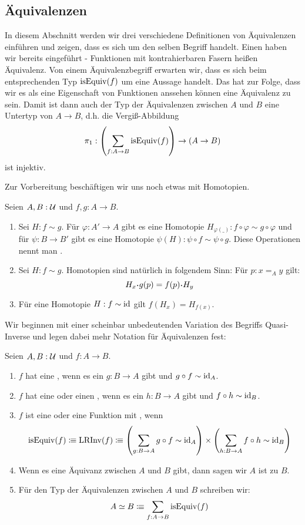 \subsection{Äquivalenzen}
\label{sub:aequivalenzen}

In diesem Abschnitt werden wir drei verschiedene Definitionen von Äquivalenzen einführen und zeigen,
dass es sich um den selben Begriff handelt. Einen haben wir bereits eingeführt - Funktionen mit kontrahierbaren Fasern heißen Äquivalenz.
Von einem Äquivalenzbegriff erwarten wir, dass es sich beim entsprechenden Typ $\mathrm{isEquiv}(f)$ um eine Aussage handelt.
Das hat zur Folge, dass wir es als eine Eigenschaft von Funktionen anssehen können eine Äquivalenz zu sein.
Damit ist dann auch der Typ der Äquivalenzen zwischen $A$ und $B$ eine Untertyp von $A\to B$, d.h. die Vergiß-Abbildung
\[
  \pi_1:\left(\sum_{f:A\to B}\mathrm{isEquiv}(f)\right)\to (A\to B)
\]
ist injektiv.

Zur Vorbereitung beschäftigen wir uns noch etwas mit Homotopien.
\begin{bemerkung}
  Seien $A,B:\mathcal{U}$ und $f,g:A\to B$.
  \begin{enumerate}
  \item Sei $H:f\sim g$. Für $\varphi:A'\to A$ gibt es eine Homotopie $H_{\varphi(\_)}:f\circ \varphi\sim g\circ \varphi$ und für $\psi:B\to B'$ gibt es eine Homotopie $\psi(H):\psi\circ f\sim \psi\circ g$. Diese Operationen nennt man .
  \item Sei $H:f\sim g$. Homotopien sind natürlich in folgendem Sinn: Für $p:x=_A y$ gilt:
    \[
      H_x\kon g(p) = f(p)\kon H_{y}
    \]
  \item Für eine Homotopie $H:f\sim\mathrm{id}$ gilt $f(H_x)=H_{f(x)}$.
  \end{enumerate}
\end{bemerkung}


Wir beginnen mit einer scheinbar unbedeutenden Variation des Begriffs Quasi-Inverse und legen dabei mehr Notation für Äquivalenzen fest:

\begin{definition}
  Seien $A,B:\mathcal{U}$ und $f:A\to B$.
  \begin{enumerate}
  \item $f$ hat eine , wenn es ein $g:B\to A$ gibt und $g\circ f\sim\mathrm{id}_A$.
  \item $f$ hat eine  oder einen , wenn es ein $h:B\to A$ gibt und $f\circ h\sim \mathrm{id}_B$.
  \item $f$ ist eine  oder eine Funktion mit , wenn
    \[
      \mathrm{isEquiv}(f)\vcentcolon\mspace{-1.2mu}\equiv\mathrm{LRInv}(f)\vcentcolon\mspace{-1.2mu}\equiv  \left(\sum_{g:B\to A}g\circ f\sim\mathrm{id}_A\right)\times\left(\sum_{h:B\to A}f\circ h\sim\mathrm{id}_B\right)
    \]
  \item Wenn es eine Äquivanz zwischen $A$ und $B$ gibt, dann sagen wir $A$ ist  zu $B$.
  \item Für den Typ der Äquivalenzen zwischen $A$ und $B$ schreiben wir:
    \[
      A\simeq B\vcentcolon\mspace{-1.2mu}\equiv\sum_{f:A\to B}\mathrm{isEquiv}(f)
    \]
  \end{enumerate}
\end{definition}

